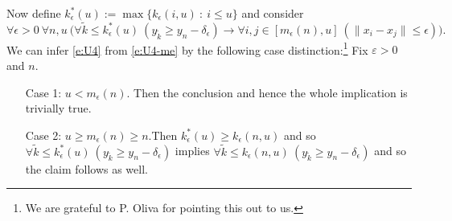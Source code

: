 Now define $k^*_\epsilon(u):=\max\{k_\epsilon(i,u)\ :\ i\leq u\}$ and consider
\[
\forall \epsilon>0\ \forall n,u\ \Big( \forall \tilde k\le k^*_\epsilon(u)\ (y_{\tilde k}\geq y_n-\delta_\epsilon)\rightarrow 
 \forall i,j\in[m_\epsilon(n),u]\ (\|x_i-x_j\|\leq \epsilon) \Big).
\tag{$**$}\label{e:U4}\]
We can infer \eqref{e:U4} from \eqref{e:U4-me} by the following case 
distinction:\footnote{We are grateful to P. Oliva for pointing this out to us.}
Fix $\varepsilon >0$ and $n.$ 
\begin{itemize}
\item[Case]  1: $u<m_\epsilon(n)$. Then the conclusion and hence the whole implication is trivially true.
\item[Case]  2: $u\geq m_\epsilon(n) \geq n$.Then $k^*_\epsilon(u)\geq 
k_\epsilon(n,u)$ and so $\forall \tilde k\le k^*_\epsilon(u)\ 
(y_{\tilde k}\geq y_n-\delta_\epsilon)$ implies $\forall \tilde k\le 
k_\epsilon(n,u)\ (y_{\tilde k}\geq y_n-\delta_\epsilon)$ and so the claim 
follows as well.
\end{itemize}

